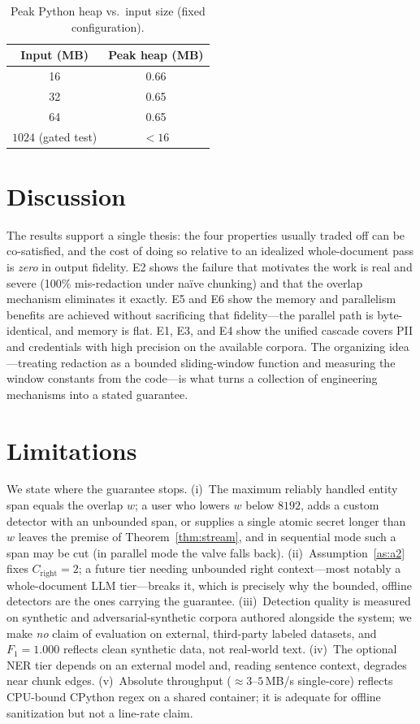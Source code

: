 \documentclass[conference]{IEEEtran}
\begin{document}
\begin{table}[t]
\centering
\caption{Peak Python heap vs.\ input size (fixed configuration).}
\label{tab:mem}
\footnotesize
\begin{tabular}{@{}cc@{}}
\toprule
Input (MB) & Peak heap (MB) \\
\midrule
16 & 0.66 \\
32 & 0.65 \\
64 & 0.65 \\
$1024$ (gated test) & ${<}16$ \\
\bottomrule
\end{tabular}
\end{table}

\section{Discussion}

The results support a single thesis: the four properties usually traded off can be
co-satisfied, and the cost of doing so relative to an idealized whole-document pass
is \emph{zero} in output fidelity. E2 shows the failure that motivates the work is
real and severe (100\% mis-redaction under na\"ive chunking) and that the overlap
mechanism eliminates it exactly. E5 and E6 show the memory and parallelism
benefits are achieved without sacrificing that fidelity---the parallel path is
byte-identical, and memory is flat. E1, E3, and E4 show the unified cascade covers
PII and credentials with high precision on the available corpora. The organizing
idea---treating redaction as a bounded sliding-window function and measuring the
window constants from the code---is what turns a collection of engineering
mechanisms into a stated guarantee.

\section{Limitations}\label{sec:limits}

We state where the guarantee stops. (i)~The maximum reliably handled entity span
equals the overlap $w$; a user who lowers $w$ below $8192$, adds a custom detector
with an unbounded span, or supplies a single atomic secret longer than $w$ leaves
the premise of Theorem~\ref{thm:stream}, and in sequential mode such a span may be
cut (in parallel mode the valve falls back). (ii)~Assumption~\ref{as:a2} fixes
$C_{\mathrm{right}}=2$; a future tier needing unbounded right context---most
notably a whole-document LLM tier---breaks it, which is precisely why the bounded,
offline detectors are the ones carrying the guarantee. (iii)~Detection quality is
measured on synthetic and adversarial-synthetic corpora authored alongside the
system; we make \emph{no} claim of evaluation on external, third-party labeled
datasets, and $F_1{=}1.000$ reflects clean synthetic data, not real-world text.
(iv)~The optional NER tier depends on an external model and, reading sentence
context, degrades near chunk edges. (v)~Absolute throughput ($\approx3$--$5$\,MB/s
single-core) reflects CPU-bound CPython regex on a shared container; it is adequate
for offline sanitization but not a line-rate claim.
\end{document}
